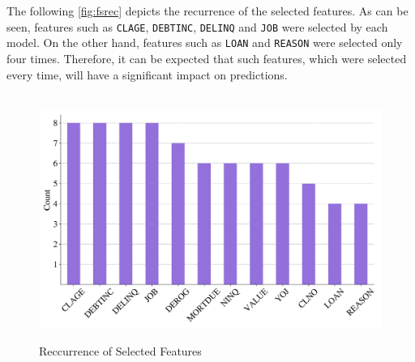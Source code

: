 The following \autoref{fig:fsrec} depicts the recurrence of the selected features. As can be seen, features such as \texttt{CLAGE}, \texttt{DEBTINC}, \texttt{DELINQ} and \texttt{JOB} were selected by each model.
On the other hand, features such as \texttt{LOAN} and \texttt{REASON} were selected only four times. Therefore, it can be expected that such features, which were selected every time, will have a significant impact on predictions.
\begin{figure}[H]
\centering
\caption{Reccurrence of Selected Features}\vspace{0.5em}
\label{fig:fsrec}\
\includegraphics[width=120mm]{Figures/Recurrence_Selected_Features.jpg}

\vspace{-1em}
\end{figure}


